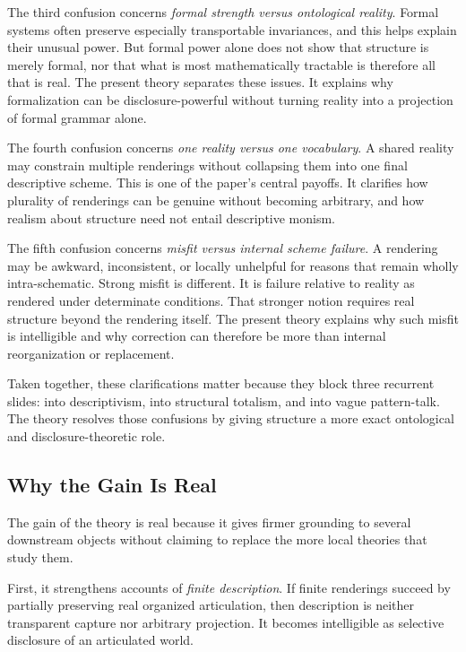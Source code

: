 \documentclass[11pt]{article}
\renewcommand{\emph}[1]{\textit{#1}}
\begin{document}
The third confusion concerns \emph{formal strength versus ontological reality}. Formal systems often preserve especially transportable invariances, and this helps explain their unusual power. But formal power alone does not show that structure is merely formal, nor that what is most mathematically tractable is therefore all that is real. The present theory separates these issues. It explains why formalization can be disclosure-powerful without turning reality into a projection of formal grammar alone. \cite{Cassirer1953SubstanceFunction,Shapiro2000ThinkingAboutMathematics}

The fourth confusion concerns \emph{one reality versus one vocabulary}. A shared reality may constrain multiple renderings without collapsing them into one final descriptive scheme. This is one of the paper's central payoffs. It clarifies how plurality of renderings can be genuine without becoming arbitrary, and how realism about structure need not entail descriptive monism. \cite{Massimi2022PerspectivalRealism,Chang2022RealismForRealisticPeople}

The fifth confusion concerns \emph{misfit versus internal scheme failure}. A rendering may be awkward, inconsistent, or locally unhelpful for reasons that remain wholly intra-schematic. Strong misfit is different. It is failure relative to reality as rendered under determinate conditions. That stronger notion requires real structure beyond the rendering itself. The present theory explains why such misfit is intelligible and why correction can therefore be more than internal reorganization or replacement. \cite{FriggNguyen2021ScientificRepresentationSEP}

Taken together, these clarifications matter because they block three recurrent slides: into descriptivism, into structural totalism, and into vague pattern-talk. The theory resolves those confusions by giving structure a more exact ontological and disclosure-theoretic role.

\subsection{Why the Gain Is Real}

The gain of the theory is real because it gives firmer grounding to several downstream objects without claiming to replace the more local theories that study them.

First, it strengthens accounts of \emph{finite description}. If finite renderings succeed by partially preserving real organized articulation, then description is neither transparent capture nor arbitrary projection. It becomes intelligible as selective disclosure of an articulated world. \cite{FriggHartmann2025ModelsScienceSEP,FriggNguyen2021ScientificRepresentationSEP}
\end{document}
